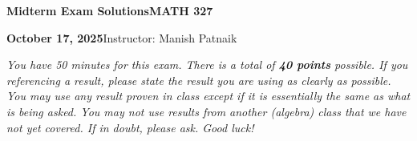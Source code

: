 \documentclass[11pt,reqno]{amsart}
\begin{document}
\begin{tcolorbox}[lecturebox,colback=lightblue,colframe=courseblue,
  boxrule=0pt,left=3mm,right=3mm,top=3mm,bottom=3mm]
  {\color{courseblue}\bfseries\Large Midterm Exam Solutions\hfill MATH 327}\par
  \smallskip
  \textbf{October 17, 2025}\hfill Instructor: Manish Patnaik
\end{tcolorbox}



\emph{You have 50 minutes for this exam. There is a total of \textbf{40 points} possible. If you referencing a result, please state the result you are using as clearly as possible. You may use any result proven in class except if it is essentially the same as what is being asked. You may not use results from another (algebra) class that we have not yet covered. If in doubt, please ask. Good luck! }  


\vspace{0.15in} 
\end{document}
